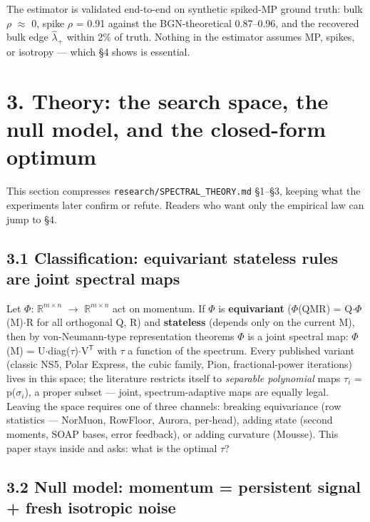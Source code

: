 \documentclass[
]{article}
\begin{document}
The estimator is validated end-to-end on synthetic spiked-MP ground
truth: bulk \(\rho\) \(\approx\) 0, spike \(\rho\) = 0.91 against the
BGN-theoretical 0.87--0.96, and the recovered bulk edge
\(\hat{\lambda}_+\) within 2\% of truth. Nothing in the estimator
assumes MP, spikes, or isotropy --- which §4 shows is essential.

\section{3. Theory: the search space, the null model, and the
closed-form
optimum}\label{theory-the-search-space-the-null-model-and-the-closed-form-optimum}

This section compresses \texttt{research/SPECTRAL\_THEORY.md} §1--§3,
keeping what the experiments later confirm or refute. Readers who want
only the empirical law can jump to §4.

\subsection{3.1 Classification: equivariant stateless rules are joint
spectral
maps}\label{classification-equivariant-stateless-rules-are-joint-spectral-maps}

Let \(\Phi\): \(\mathbb{R}^{m\times n}\) \(\to\)
\(\mathbb{R}^{m\times n}\) act on momentum. If \(\Phi\) is
\textbf{equivariant} (\(\Phi\)(QMR) =
Q\(\cdot\)\(\Phi\)(M)\(\cdot\){}R for all orthogonal Q, R) and
\textbf{stateless} (depends only on the current M), then by
von-Neumann-type representation theorems \(\Phi\) is a joint spectral
map: \(\Phi\)(M) =
U\(\cdot\){}diag(\(\tau\))\(\cdot\){}V\(^{\mathsf{T}}\) with
\(\tau\) a function of the spectrum. Every published variant (classic
NS5, Polar Express, the cubic family, Pion, fractional-power iterations)
lives in this space; the literature restricts itself to \emph{separable
polynomial} maps \(\tau_i\) = p(\(\sigma_i\)), a proper subset ---
joint, spectrum-adaptive maps are equally legal. Leaving the space
requires one of three channels: breaking equivariance (row statistics
--- NorMuon, RowFloor, Aurora, per-head), adding state (second moments,
SOAP bases, error feedback), or adding curvature (Mousse). This paper
stays inside and asks: what is the optimal \(\tau\)?

\subsection{3.2 Null model: momentum = persistent signal + fresh
isotropic
noise}\label{null-model-momentum-persistent-signal-fresh-isotropic-noise}
\end{document}
